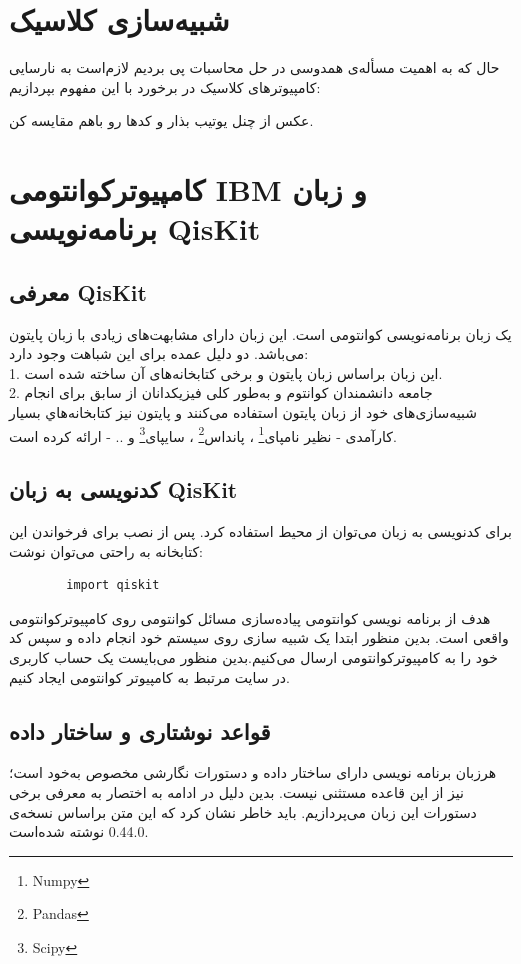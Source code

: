 \documentclass{book}
\begin{document}
\section{شبیه‌سازی کلاسیک}
حال که به اهمیت مسأله‌ی همدوسی در حل محاسبات پی بردیم لازم‌است به نارسایی کامپیوتر‌های کلاسیک در برخورد با این مفهوم بپردازیم:

عکس از چنل یوتیب بذار و کدها رو باهم مقایسه کن.


\newpage
\section{کامپیوترکوانتومی IBM و زبان برنامه‌نویسی QisKit}

\subsection{معرفی QisKit}
یک زبان برنامه‌نویسی کوانتومی است. این زبان دارای مشابهت‌های زیادی با زبان پایتون می‌باشد. دو دلیل عمده برای این شباهت وجود دارد:\\
 1. این زبان براساس زبان پایتون و برخی کتابخانه‌های آن ساخته شده است. \\
 2. جامعه دانشمندان کوانتوم و به‌طور کلی فیزیکدانان از سابق برای انجام شبیه‌سازی‌های خود از زبان پایتون استفاده می‌کنند و پایتون نیز کتابخانه‌هاي بسیار کارآمدی - نظیر نامپای\footnote{Numpy} ، پانداس\footnote{Pandas} ، سایپای\footnote{Scipy} و .. - ارائه کرده است.

\subsection{کدنویسی به زبان QisKit}
برای کدنویسی به زبان  می‌توان از محیط  استفاده کرد. پس از نصب  برای فرخواندن این کتابخانه به راحتی می‌توان نوشت:

\begin{latin}
	\begin{verbatim}
		import qiskit
	\end{verbatim}
\end{latin}

هدف از برنامه نویسی کوانتومی پیاده‌سازی مسائل کوانتومی روی کامپیوتر‌کوانتومی‌ واقعی است. بدین منظور ابتدا یک شبیه سازی روی سیستم خود انجام داده و سپس کد خود را به کامپیوتر‌کوانتومی  ارسال می‌کنیم.بدین منظور می‌بایست یک حساب کاربری در سایت مرتبط به کامپیوتر کوانتومی  ایجاد کنیم.


\subsection{قواعد نوشتاری و ساختار داده}
هرزبان برنامه نویسی دارای ساختار داده و دستورات نگارشی مخصوص به‌خود است؛  نیز از این قاعده مستثنی نیست. بدین دلیل در ادامه به اختصار به معرفی برخی دستورات این زبان می‌پردازیم. باید خاطر نشان کرد که این متن براساس  نسخه‌ی  0.44.0 نوشته‌ شده‌است.
\end{document}
